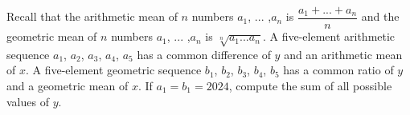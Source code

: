 Recall that the arithmetic mean of $n$ numbers $a_1$, $...$ ,$ a_n$ is $\dfrac{a_1+...+a_n}{n}$ and the geometric mean of $n$ numbers $a_1$, $...$ ,$ a_n$ is $\sqrt[n]{a_1 ... a_n}$. A five-element arithmetic sequence $a_1$, $a_2$, $a_3$, $a_4$, $a_5$ has a common difference of $y$ and an arithmetic mean of $x$. A five-element geometric sequence $b_1$, $b_2$, $b_3$, $b_4$, $b_5$ has a common ratio of $y$ and a geometric mean of $x$. If $a_1 = b_1 = 2024$, compute the sum of all possible values of $y$.
